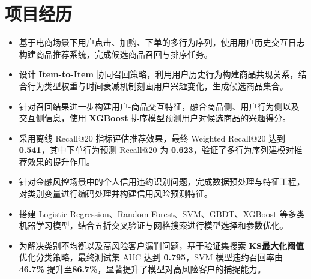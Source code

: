 \documentclass{resume}
\begin{document}
\begingroup
{}
\section{项目经历}




\begin{itemize}

  \item 基于电商场景下用户点击、加购、下单的多行为序列，使用用户历史交互日志构建商品推荐系统，完成候选商品召回与排序任务。

  \item 设计 \textbf{Item-to-Item} 协同召回策略，利用用户历史行为构建商品共现关系，结合行为类型权重与时间衰减机制刻画用户兴趣变化，生成候选商品集合。

  \item 针对召回结果进一步构建用户-商品交互特征，融合商品侧、用户行为侧以及交互侧信息，使用 \textbf{XGBoost} 排序模型预测用户对候选商品的兴趣得分。
  
  \item 采用离线 Recall@20 指标评估推荐效果，最终 Weighted Recall@20 达到\textbf{0.541}，其中下单行为预测 Recall@20 为 \textbf{0.623}，验证了多行为序列建模对推荐效果的提升作用。
\end{itemize} 


\begin{itemize}

  \item 针对金融风控场景中的个人信用违约识别问题，完成数据预处理与特征工程，对类别变量进行编码处理并构建信用风险预测特征。

  \item 搭建 Logistic Regression、Random Forest、SVM、GBDT、XGBoost 等多类机器学习模型，结合五折交叉验证与网格搜索进行模型选择和参数优化。

  \item 为解决类别不均衡以及高风险客户漏判问题，基于验证集搜索 \textbf{KS最大化阈值} 优化分类策略，最终测试集 AUC 达到 \textbf{0.795}，SVM 模型违约召回率由\textbf{46.7\%} 提升至\textbf{86.7\%}，显著提升了模型对高风险客户的捕捉能力。

\end{itemize}
    

\end{document}
